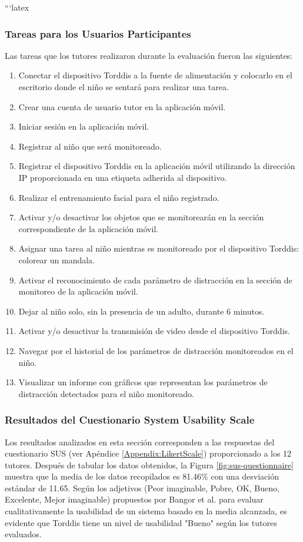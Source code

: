 \documentclass[a4paper,fleqn]{cas-sc}
\begin{document}
	```latex
	\subsubsection{Tareas para los Usuarios Participantes}
	Las tareas que los tutores realizaron durante la evaluación fueron las siguientes:
	
	\begin{enumerate}
		\item Conectar el dispositivo Torddis a la fuente de alimentación y colocarlo en el escritorio donde el niño se sentará para realizar una tarea.
		\item Crear una cuenta de usuario tutor en la aplicación móvil.
		\item Iniciar sesión en la aplicación móvil.
		\item Registrar al niño que será monitoreado.
		\item Registrar el dispositivo Torddis en la aplicación móvil utilizando la dirección IP proporcionada en una etiqueta adherida al dispositivo.
		\item Realizar el entrenamiento facial para el niño registrado.
		\item Activar y/o desactivar los objetos que se monitorearán en la sección correspondiente de la aplicación móvil.
		\item Asignar una tarea al niño mientras es monitoreado por el dispositivo Torddis: colorear un mandala.
		\item Activar el reconocimiento de cada parámetro de distracción en la sección de monitoreo de la aplicación móvil.
		\item Dejar al niño solo, sin la presencia de un adulto, durante 6 minutos.
		\item Activar y/o desactivar la transmisión de video desde el dispositivo Torddis.
		\item Navegar por el historial de los parámetros de distracción monitoreados en el niño.
		\item Visualizar un informe con gráficos que representan los parámetros de distracción detectados para el niño monitoreado.
	\end{enumerate}
	
	\subsubsection{Resultados del Cuestionario System Usability Scale}
	Los resultados analizados en esta sección corresponden a las respuestas del cuestionario SUS (ver Apéndice \ref{Appendix:LikertScale}) proporcionado a los 12 tutores. Después de tabular los datos obtenidos, la Figura \ref{fig:sus-questionnaire} muestra que la media de los datos recopilados es 81.46\% con una desviación estándar de 11.65. Según los adjetivos (Peor imaginable, Pobre, OK, Bueno, Excelente, Mejor imaginable) propuestos por Bangor et al. \cite{Bangor2008AnEmpirical} para evaluar cualitativamente la usabilidad de un sistema basado en la media alcanzada, es evidente que Torddis tiene un nivel de usabilidad "Bueno" según los tutores evaluados.
	
\end{document}
